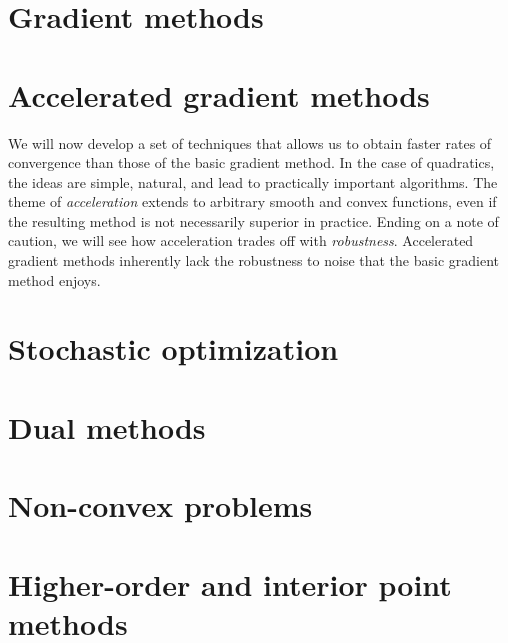 \documentclass[12pt]{article}
\begin{document}
\maketitle



\pagebreak

\setcounter{tocdepth}{2}
\tableofcontents

\pagebreak



\pagebreak
\part{Gradient methods}
\label{part:basic}








\pagebreak
\part{Accelerated gradient methods}
\label{part:accelerated}

We will now develop a set of techniques that allows us to obtain faster rates of
convergence than those of the basic gradient method. In the case of quadratics,
the ideas are simple, natural, and lead to practically important algorithms. The
theme of \emph{acceleration} extends to arbitrary smooth and convex functions,
even if the resulting method is not necessarily superior in practice.  Ending on
a note of caution, we will see how acceleration trades off with
\emph{robustness}. Accelerated gradient methods inherently lack the robustness
to noise that the basic gradient method enjoys.






\pagebreak
\part{Stochastic optimization}
\label{part:stochastic}




\pagebreak
\part{Dual methods}
\label{part:dual}





\pagebreak
\part{Non-convex problems}
\label{part:nonconvex}






\pagebreak
\part{Higher-order and interior point methods}
\label{part:higher}







\end{document}
